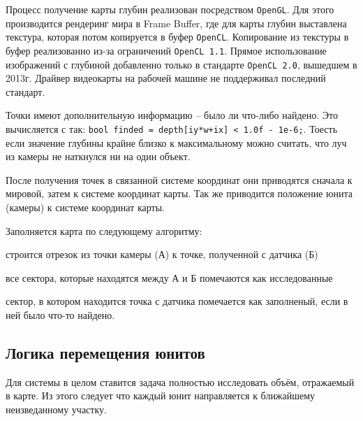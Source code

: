 \newpage

Процесс получение карты глубин реализован посредством \verb|OpenGL|. Для этого 
производится рендеринг мира в Frame Buffer, где для карты глубин выставлена текстура, 
которая потом копируется в буфер \verb|OpenCL|. Копирование из текстуры в буфер реализованно
из-за ограничений \verb|OpenCL 1.1|. Прямое использование изображений с глубиной добавленно
только в стандарте \verb|OpenCL 2.0|, вышедшем в 2013г. Драйвер видеокарты на рабочей машине
не поддерживал последний стандарт.

Точки имеют дополнительную информацию -- было ли что-либо найдено.
Это вычисляется с так: \verb|bool finded = depth[iy*w+ix] < 1.0f - 1e-6;|.
Тоесть если значение глубины крайне близко к максимальному можно считать, что
луч из камеры не наткнулся ни на один объект.

После получения точек в связанной системе координат они приводятся
сначала к мировой, затем к системе координат карты.
Так же приводится положение юнита (камеры) к системе координат карты.

Заполняется карта по следующему алгоритму:
\begin{mintemize}
    \item строится отрезок из точки камеры (А) к точке, полученной с датчика (Б)
    \item все сектора, которые находятся между А и Б помечаются как исследованные
    \item сектор, в котором находится точка с датчика помечается как заполненый,
        если в ней было что-то найдено.
\end{mintemize}

\newpage
\subsection{Логика перемещения юнитов}

Для системы в целом ставится задача полностью исследовать объём, отражаемый в карте.
Из этого следует что каждый юнит направляется к ближайшему неизведанному участку.


